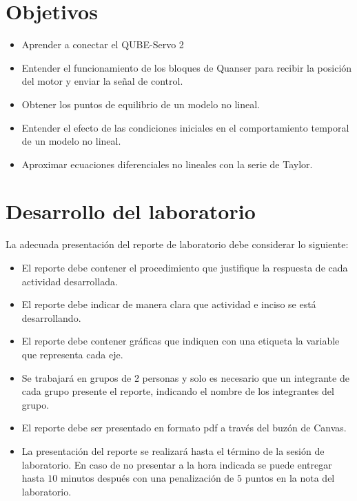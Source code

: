 	\section{Objetivos}
	\begin{itemize}
		\item Aprender a conectar el QUBE-Servo 2
		
		\item Entender el funcionamiento de los bloques de Quanser para recibir la posición del motor y enviar la señal de control.
		
		\item Obtener los puntos de equilibrio de un modelo no lineal.
	
		\item Entender el efecto de las condiciones iniciales en el comportamiento temporal de un modelo no lineal.
	
		\item Aproximar ecuaciones diferenciales no lineales con la serie de Taylor.
		
	\end{itemize}
	
	\section{Desarrollo del laboratorio}
	La adecuada presentación del reporte  de laboratorio debe considerar lo siguiente:
	
	\begin{itemize}
		\item El reporte debe contener el procedimiento que justifique la respuesta de cada actividad desarrollada.
		
		\item El reporte debe indicar de manera clara que actividad e inciso se está desarrollando.
		
		\item El reporte debe contener gráficas que indiquen con una etiqueta la variable que representa cada eje.
		
		\item Se trabajará en grupos de 2 personas y solo es necesario que un
		integrante de cada grupo presente el reporte, indicando el nombre de los
		integrantes del grupo.
		
		\item El reporte debe ser presentado en formato pdf a través del buzón de Canvas.
		
		\item La presentación del reporte se realizará hasta el término de la sesión de
		laboratorio. En caso de no presentar a la hora indicada se puede entregar hasta $10$ minutos después con una penalización de $5$ puntos en la nota del laboratorio. 
	\end{itemize}
	

